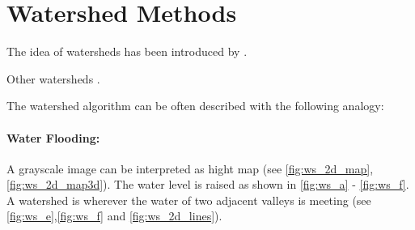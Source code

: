 \section{Watershed Methods}\label{sec:rw_watershed_methods}

The idea of watersheds has been introduced by \citet{beucher_1979_workshop}.

Other watersheds \citep{vinent_1991_pami,najman_1994_sp,roerdink_2000_finf,bertrand_2005_jmiv,cousty_2009_pami}.


The watershed algorithm can be often described with the following analogy:

\paragraph{Water Flooding:} A grayscale  image can be interpreted as hight map (see \cref{fig:ws_2d_map}, \cref{fig:ws_2d_map3d}).
The water level is raised as shown in \cref{fig:ws_a} - \cref{fig:ws_f}.
A watershed is wherever the water of two adjacent valleys is meeting (see \cref{fig:ws_e},\cref{fig:ws_f} and \cref{fig:ws_2d_lines}).


